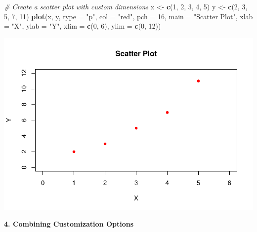 \documentclass[
]{book}
\newenvironment{Shaded}{\begin{snugshade}}{\end{snugshade}}
\newcommand{\AttributeTok}[1]{\textcolor[rgb]{0.13,0.29,0.53}{#1}}
\newcommand{\CommentTok}[1]{\textcolor[rgb]{0.56,0.35,0.01}{\textit{#1}}}
\newcommand{\DecValTok}[1]{\textcolor[rgb]{0.00,0.00,0.81}{#1}}
\newcommand{\FunctionTok}[1]{\textcolor[rgb]{0.13,0.29,0.53}{\textbf{#1}}}
\newcommand{\NormalTok}[1]{#1}
\newcommand{\OtherTok}[1]{\textcolor[rgb]{0.56,0.35,0.01}{#1}}
\newcommand{\StringTok}[1]{\textcolor[rgb]{0.31,0.60,0.02}{#1}}
\begin{document}
\begin{Shaded}
\begin{Highlighting}[]
\CommentTok{\# Create a scatter plot with custom dimensions}
\NormalTok{x }\OtherTok{\textless{}{-}} \FunctionTok{c}\NormalTok{(}\DecValTok{1}\NormalTok{, }\DecValTok{2}\NormalTok{, }\DecValTok{3}\NormalTok{, }\DecValTok{4}\NormalTok{, }\DecValTok{5}\NormalTok{)}
\NormalTok{y }\OtherTok{\textless{}{-}} \FunctionTok{c}\NormalTok{(}\DecValTok{2}\NormalTok{, }\DecValTok{3}\NormalTok{, }\DecValTok{5}\NormalTok{, }\DecValTok{7}\NormalTok{, }\DecValTok{11}\NormalTok{)}
\FunctionTok{plot}\NormalTok{(x, y, }\AttributeTok{type =} \StringTok{"p"}\NormalTok{, }\AttributeTok{col =} \StringTok{"red"}\NormalTok{, }\AttributeTok{pch =} \DecValTok{16}\NormalTok{, }\AttributeTok{main =} \StringTok{"Scatter Plot"}\NormalTok{, }\AttributeTok{xlab =} \StringTok{"X"}\NormalTok{, }\AttributeTok{ylab =} \StringTok{"Y"}\NormalTok{, }\AttributeTok{xlim =} \FunctionTok{c}\NormalTok{(}\DecValTok{0}\NormalTok{, }\DecValTok{6}\NormalTok{), }\AttributeTok{ylim =} \FunctionTok{c}\NormalTok{(}\DecValTok{0}\NormalTok{, }\DecValTok{12}\NormalTok{))}
\end{Highlighting}
\end{Shaded}

\includegraphics{_main_files/figure-latex/unnamed-chunk-34-1.pdf}

\textbf{4. Combining Customization Options}
\end{document}
